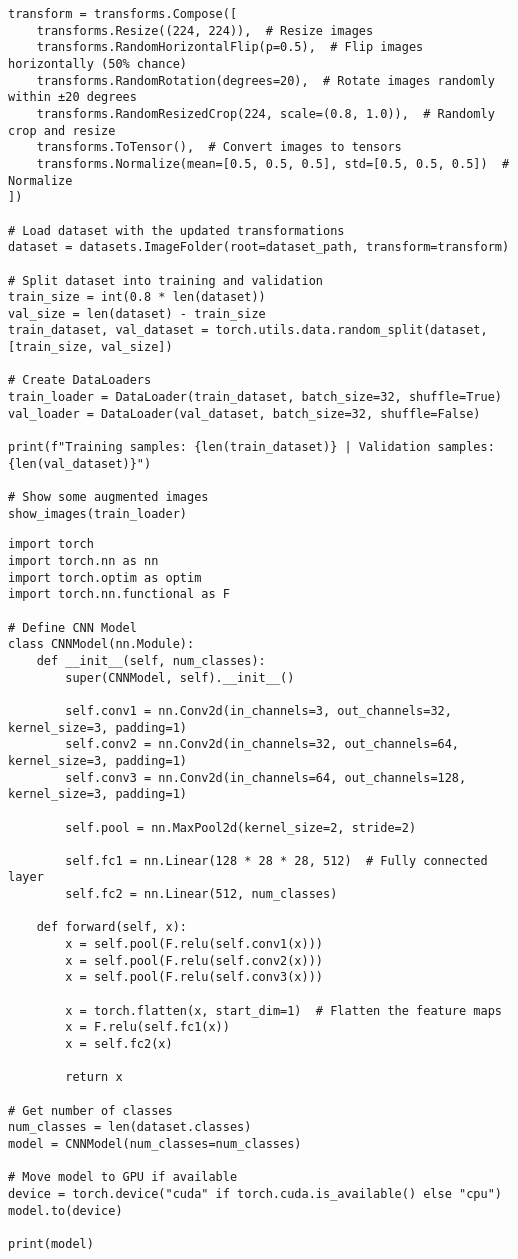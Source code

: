 \begin{verbatim}
transform = transforms.Compose([
    transforms.Resize((224, 224)),  # Resize images
    transforms.RandomHorizontalFlip(p=0.5),  # Flip images horizontally (50% chance)
    transforms.RandomRotation(degrees=20),  # Rotate images randomly within ±20 degrees
    transforms.RandomResizedCrop(224, scale=(0.8, 1.0)),  # Randomly crop and resize
    transforms.ToTensor(),  # Convert images to tensors
    transforms.Normalize(mean=[0.5, 0.5, 0.5], std=[0.5, 0.5, 0.5])  # Normalize
])

# Load dataset with the updated transformations
dataset = datasets.ImageFolder(root=dataset_path, transform=transform)

# Split dataset into training and validation
train_size = int(0.8 * len(dataset))
val_size = len(dataset) - train_size
train_dataset, val_dataset = torch.utils.data.random_split(dataset, [train_size, val_size])

# Create DataLoaders
train_loader = DataLoader(train_dataset, batch_size=32, shuffle=True)
val_loader = DataLoader(val_dataset, batch_size=32, shuffle=False)

print(f"Training samples: {len(train_dataset)} | Validation samples: {len(val_dataset)}")

# Show some augmented images
show_images(train_loader)

\end{verbatim}

\begin{verbatim}
import torch
import torch.nn as nn
import torch.optim as optim
import torch.nn.functional as F

# Define CNN Model
class CNNModel(nn.Module):
    def __init__(self, num_classes):
        super(CNNModel, self).__init__()

        self.conv1 = nn.Conv2d(in_channels=3, out_channels=32, kernel_size=3, padding=1)
        self.conv2 = nn.Conv2d(in_channels=32, out_channels=64, kernel_size=3, padding=1)
        self.conv3 = nn.Conv2d(in_channels=64, out_channels=128, kernel_size=3, padding=1)

        self.pool = nn.MaxPool2d(kernel_size=2, stride=2)

        self.fc1 = nn.Linear(128 * 28 * 28, 512)  # Fully connected layer
        self.fc2 = nn.Linear(512, num_classes)

    def forward(self, x):
        x = self.pool(F.relu(self.conv1(x)))
        x = self.pool(F.relu(self.conv2(x)))
        x = self.pool(F.relu(self.conv3(x)))

        x = torch.flatten(x, start_dim=1)  # Flatten the feature maps
        x = F.relu(self.fc1(x))
        x = self.fc2(x)

        return x

# Get number of classes
num_classes = len(dataset.classes)
model = CNNModel(num_classes=num_classes)

# Move model to GPU if available
device = torch.device("cuda" if torch.cuda.is_available() else "cpu")
model.to(device)

print(model)

\end{verbatim}


